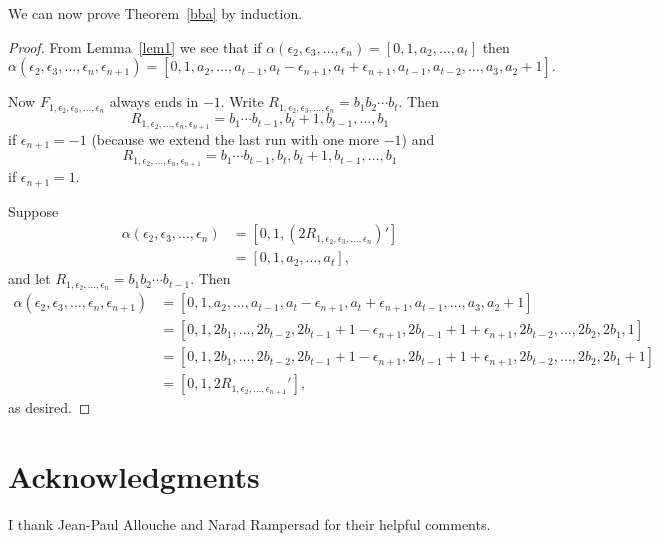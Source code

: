 \documentclass[12pt,reqno]{article}
\begin{document}
We can now prove Theorem~\ref{bba} by induction.
\begin{proof}
From Lemma~\ref{lem1} we see that
if $\alpha(\epsilon_2, \epsilon_3, \ldots, \epsilon_n) 
= [0, 1, a_2, \ldots, a_t]$
then
$$\alpha(\epsilon_2, \epsilon_3, \ldots, \epsilon_n, \epsilon_{n+1})
= [0, 1, a_2, \ldots, a_{t-1}, a_t - \epsilon_{n+1},
a_t + \epsilon_{n+1}, a_{t-1}, a_{t-2}, \ldots, a_3, a_2+1] .$$

Now
$F_{1, \epsilon_2, \epsilon_3, \ldots, \epsilon_n}$
always ends in $-1$.
Write
$R_{1, \epsilon_2, \epsilon_3, \ldots, \epsilon_n} 
= b_1 b_2 \cdots b_t$.  Then
$$R_{1, \epsilon_2, \ldots, \epsilon_n, \epsilon_{n+1}}
= b_1 \cdots b_{t-1}, b_t +1, b_{t-1}, \ldots, b_1$$
if $\epsilon_{n+1} = -1$ (because we extend the
last run with one more $-1$) and
$$R_{1, \epsilon_2, \ldots, \epsilon_n, \epsilon_{n+1}}
= b_1 \cdots b_{t-1}, b_t, b_t+1, b_{t-1}, \ldots, b_1$$
if $\epsilon_{n+1} =1$.

Suppose
\begin{align*}
\alpha(\epsilon_2, \epsilon_3, \ldots, \epsilon_n) &= 
[0, 1, (2R_{1, \epsilon_2, \epsilon_3, \ldots, \epsilon_n})'] \\
&= [0, 1, a_2, \ldots, a_t ],
\end{align*}
and let
$R_{1, \epsilon_2, \ldots, \epsilon_n} = b_1 b_2 \cdots b_{t-1}$.
Then
\begin{align*}
\alpha(\epsilon_2, \epsilon_3, \ldots, \epsilon_n, \epsilon_{n+1} )
&= [0, 1, a_2, \ldots, a_{t-1}, a_t - \epsilon_{n+1}, a_t + \epsilon_{n+1},
	a_{t-1}, \ldots, a_3, a_2+1]  \\
&= [0, 1, 2b_1, \ldots, 2b_{t-2}, 2b_{t-1} + 1 - \epsilon_{n+1},
2b_{t-1} + 1 + \epsilon_{n+1}, 2b_{t-2}, \ldots, 2b_2, 2b_1,1] \\
&= [0, 1, 2b_1, \ldots, 2b_{t-2}, 2b_{t-1} + 1 - \epsilon_{n+1}, 
2b_{t-1} + 1 + \epsilon_{n+1}, 2b_{t-2}, \ldots, 2b_2, 2b_1 + 1]  \\
&= [0, 1, 2R_{1, \epsilon_2, \ldots, \epsilon_{n+1}}'] ,
\end{align*}
as desired.
\end{proof}

\section{Acknowledgments}

I thank Jean-Paul Allouche and Narad Rampersad for their helpful comments.
\end{document}
